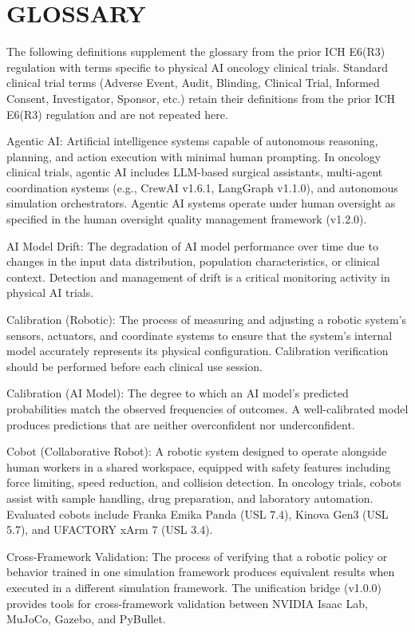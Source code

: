 \section{GLOSSARY}

The following definitions supplement the glossary from the prior ICH E6(R3) regulation with terms specific to physical AI oncology clinical trials. Standard clinical trial terms (Adverse Event, Audit, Blinding, Clinical Trial, Informed Consent, Investigator, Sponsor, etc.) retain their definitions from the prior ICH E6(R3) regulation and are not repeated here.

Agentic AI: Artificial intelligence systems capable of autonomous reasoning, planning, and action execution with minimal human prompting. In oncology clinical trials, agentic AI includes LLM-based surgical assistants, multi-agent coordination systems (e.g., CrewAI v1.6.1, LangGraph v1.1.0), and autonomous simulation orchestrators. Agentic AI systems operate under human oversight as specified in the human oversight quality management framework (v1.2.0).

AI Model Drift: The degradation of AI model performance over time due to changes in the input data distribution, population characteristics, or clinical context. Detection and management of drift is a critical monitoring activity in physical AI trials.

Calibration (Robotic): The process of measuring and adjusting a robotic system's sensors, actuators, and coordinate systems to ensure that the system's internal model accurately represents its physical configuration. Calibration verification should be performed before each clinical use session.

Calibration (AI Model): The degree to which an AI model's predicted probabilities match the observed frequencies of outcomes. A well-calibrated model produces predictions that are neither overconfident nor underconfident.

Cobot (Collaborative Robot): A robotic system designed to operate alongside human workers in a shared workspace, equipped with safety features including force limiting, speed reduction, and collision detection. In oncology trials, cobots assist with sample handling, drug preparation, and laboratory automation. Evaluated cobots include Franka Emika Panda (USL 7.4), Kinova Gen3 (USL 5.7), and UFACTORY xArm 7 (USL 3.4).

Cross-Framework Validation: The process of verifying that a robotic policy or behavior trained in one simulation framework produces equivalent results when executed in a different simulation framework. The unification bridge (v1.0.0) provides tools for cross-framework validation between NVIDIA Isaac Lab, MuJoCo, Gazebo, and PyBullet.

